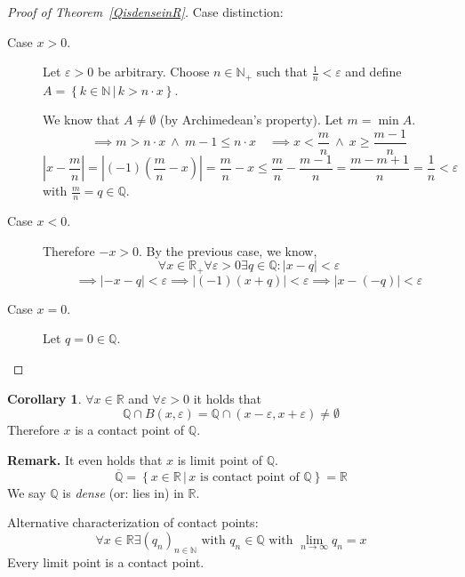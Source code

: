 \documentclass[a4paper,landscape,twocolumn]{article}
\theoremstyle{definition}
\newtheorem{cor}{Corollary}
\newcommand\setdef[2]{\left\{#1\,|\,#2\right\}}
\newcommand\abs[1]{\left|#1\right|}
\begin{document}
\begin{proof}[Proof of Theorem~\ref{QisdenseinR}]
  Case distinction:
  \begin{description}
    \item[Case $x > 0$.]
      Let $\varepsilon > 0$ be arbitrary.
      Choose $n \in \mathbb N_+$ such that $\frac1n < \varepsilon$
      and define $A = \setdef{k \in \mathbb N}{k > n \cdot x}$.

      We know that $A \neq \emptyset$ (by Archimedean's property).
      Let $m = \min{A}$.
      \[
        \implies m > n \cdot x \:\land\: m - 1 \leq n \cdot x
        \quad\implies x < \frac mn \:\land\: x \geq \frac{m-1}{n}
      \]
      \[
        \abs{x - \frac mn} = \abs{(-1) \left(\frac mn - x\right)}
        = \frac mn - x \leq \frac mn - \frac{m-1}{n}
        = \frac{m - m + 1}{n} = \frac 1n < \varepsilon
      \]
      with $\frac mn = q \in \mathbb Q$.
    \item[Case $x < 0$.]
      Therefore $-x > 0$. By the previous case, we know,
      \[ \forall x \in \mathbb R_+ \forall \varepsilon > 0 \exists q \in \mathbb Q: \abs{x - q} < \varepsilon \]
      \[ \implies \abs{-x - q} < \varepsilon \implies \abs{(-1) (x + q)} < \varepsilon \implies \abs{x - (-q)} < \varepsilon \]
    \item[Case $x = 0$.]
      Let $q = 0 \in \mathbb Q$.
  \end{description}
\end{proof}
\begin{cor}
  $\forall x \in \mathbb R$ and $\forall \varepsilon > 0$ it holds that
  \[
    \mathbb Q \cap B(x, \varepsilon)
    = \mathbb Q \cap (x - \varepsilon, x + \varepsilon)
    \neq \emptyset
  \]
  Therefore $x$ is a contact point of $\mathbb Q$.

  \textbf{Remark.}
  It even holds that $x$ is limit point of $\mathbb Q$.
  \[
    \overline{\mathbb Q}
      = \setdef{x \in \mathbb R}{x \text{ is contact point of } \mathbb Q}
      = \mathbb R
  \]
  We say $\mathbb Q$ is \emph{dense} (or: lies in) in $\mathbb R$.

  Alternative characterization of contact points:
  \[
    \forall x \in \mathbb R \exists (q_n)_{n \in \mathbb N}
    \text{ with } q_n \in \mathbb Q
    \text{ with } \lim_{n \to \infty} q_n = x
  \]
  Every limit point is a contact point.
\end{cor}
\end{document}

